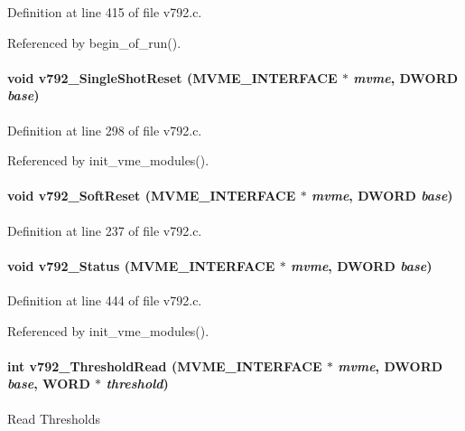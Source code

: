 Definition at line 415 of file v792.c.

Referenced by begin\_\-of\_\-run().
\paragraph[{v792\_\-SingleShotReset}]{\setlength{\rightskip}{0pt plus 5cm}void v792\_\-SingleShotReset ({\bf MVME\_\-INTERFACE} $\ast$ {\em mvme}, \/  {\bf DWORD} {\em base})}\hfill\label{v792_8h_a00c1512a1b145d46fdac9cbbfa867f61}


Definition at line 298 of file v792.c.

Referenced by init\_\-vme\_\-modules().
\paragraph[{v792\_\-SoftReset}]{\setlength{\rightskip}{0pt plus 5cm}void v792\_\-SoftReset ({\bf MVME\_\-INTERFACE} $\ast$ {\em mvme}, \/  {\bf DWORD} {\em base})}\hfill\label{v792_8h_aff0ebd895470a6d2708042eb48eb314b}


Definition at line 237 of file v792.c.
\paragraph[{v792\_\-Status}]{\setlength{\rightskip}{0pt plus 5cm}void v792\_\-Status ({\bf MVME\_\-INTERFACE} $\ast$ {\em mvme}, \/  {\bf DWORD} {\em base})}\hfill\label{v792_8h_a3df455258c8d38e5c7959b0e16c64583}


Definition at line 444 of file v792.c.

Referenced by init\_\-vme\_\-modules().
\paragraph[{v792\_\-ThresholdRead}]{\setlength{\rightskip}{0pt plus 5cm}int v792\_\-ThresholdRead ({\bf MVME\_\-INTERFACE} $\ast$ {\em mvme}, \/  {\bf DWORD} {\em base}, \/  {\bf WORD} $\ast$ {\em threshold})}\hfill\label{v792_8h_a6410a5e010a043f3c1f0ccac13e89ec4}
Read Thresholds 

